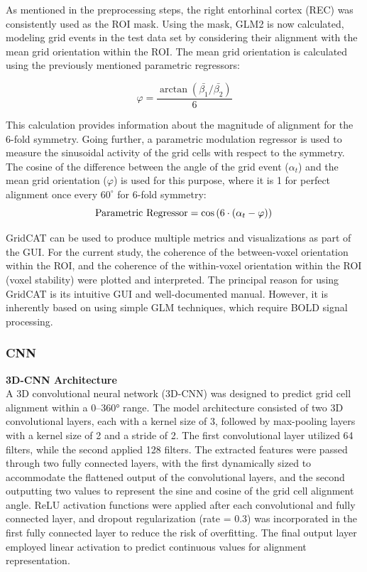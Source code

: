 \documentclass[a4paper]{article}
\begin{document}
\noindent As mentioned in the preprocessing steps, the right entorhinal cortex (REC) was consistently used as the ROI mask. Using the mask, GLM2 is now calculated, modeling grid events in the test data set by considering their alignment with the mean grid orientation within the ROI. The mean grid orientation is calculated using the previously mentioned parametric regressors: 

\begin{equation}
\text{$\varphi$} = \frac{\arctan(\bar{\beta_1}/\bar{\beta_2})}{6}
\end{equation}

\noindent This calculation provides information about the magnitude of alignment for the 6-fold symmetry. Going further, a parametric modulation regressor is used to measure the sinusoidal activity of the grid cells with respect to the symmetry. The cosine of the difference between the angle of the grid event ($\alpha_t$) and the mean grid orientation ($\varphi$) is used for this purpose, where it is 1 for perfect alignment once every $60^{\circ}$ for 6-fold symmetry: \\
\begin{equation}
\text{Parametric Regressor} = \cos\left( 6 \cdot (\alpha_t - \varphi) \right) \\
\end{equation}


\noindent GridCAT can be used to produce multiple metrics and visualizations as part of the GUI. For the current study, the coherence of the between-voxel orientation within the ROI, and the coherence of the within-voxel orientation within the ROI (voxel stability) were plotted and interpreted. The principal reason for using GridCAT is its intuitive GUI and well-documented manual. However, it is inherently based on using simple GLM techniques, which require BOLD signal processing. \\

\subsubsection{\textbf{CNN}}
\noindent \textbf{3D-CNN Architecture}\\
\noindent A 3D convolutional neural network (3D-CNN) was designed to predict grid cell alignment within a 0–360° range. The model architecture consisted of two 3D convolutional layers, each with a kernel size of 3, followed by max-pooling layers with a kernel size of 2 and a stride of 2. The first convolutional layer utilized 64 filters, while the second applied 128 filters. The extracted features were passed through two fully connected layers, with the first dynamically sized to accommodate the flattened output of the convolutional layers, and the second outputting two values to represent the sine and cosine of the grid cell alignment angle. ReLU activation functions were applied after each convolutional and fully connected layer, and dropout regularization (rate = 0.3) was incorporated in the first fully connected layer to reduce the risk of overfitting. The final output layer employed linear activation to predict continuous values for alignment representation.\\
\end{document}
